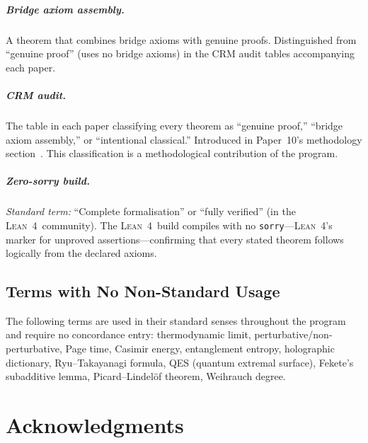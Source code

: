 \documentclass[11pt,a4paper]{report}
\theoremstyle{plain}
\theoremstyle{definition}
\theoremstyle{remark}
\newcommand{\Lean}{\textsc{Lean~4}}
\begin{document}
\paragraph{Bridge axiom assembly.}
A theorem that combines bridge axioms with genuine proofs.  Distinguished from ``genuine proof'' (uses no bridge axioms) in the CRM audit tables accompanying each paper.

\paragraph{CRM audit.}
The table in each paper classifying every theorem as ``genuine proof,'' ``bridge axiom assembly,'' or ``intentional classical.''  Introduced in Paper~10's methodology section~\cite{Lee2026P10}.  This classification is a methodological contribution of the program.

\paragraph{Zero-sorry build.}
\emph{Standard term:} ``Complete formalisation'' or ``fully verified'' (in the \Lean\ community).\quad
The \Lean\ build compiles with no \texttt{sorry}---\Lean's marker for unproved assertions---confirming that every stated theorem follows logically from the declared axioms.

\section{Terms with No Non-Standard Usage}

The following terms are used in their standard senses throughout the program and require no concordance entry: thermodynamic limit, perturbative/non-perturbative, Page time, Casimir energy, entanglement entropy, holographic dictionary, Ryu--Takayanagi formula, QES (quantum extremal surface), Fekete's subadditive lemma, Picard--Lindel\"of theorem, Weihrauch degree.

\chapter*{Acknowledgments}
\end{document}
